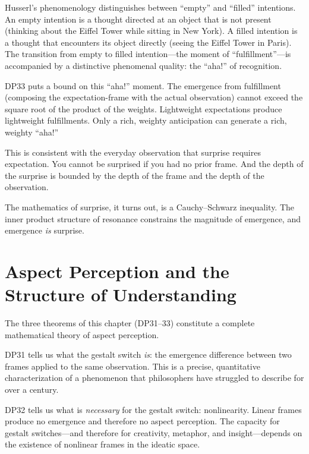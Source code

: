 \begin{interpretation}
\label{interp:phenomenology-surprise}
Husserl's phenomenology distinguishes between ``empty'' and ``filled''
intentions.  An empty intention is a thought directed at an object
that is not present (thinking about the Eiffel Tower while sitting
in New York).  A filled intention is a thought that encounters its
object directly (seeing the Eiffel Tower in Paris).  The transition
from empty to filled intention---the moment of ``fulfillment''---is
accompanied by a distinctive phenomenal quality: the ``aha!'' of
recognition.

DP33 puts a bound on this ``aha!'' moment.  The emergence from
fulfillment (composing the expectation-frame with the actual
observation) cannot exceed the square root of the product of the
weights.  Lightweight expectations produce lightweight fulfillments.
Only a rich, weighty anticipation can generate a rich, weighty
``aha!''

This is consistent with the everyday observation that surprise requires
expectation.  You cannot be surprised if you had no prior frame.
And the depth of the surprise is bounded by the depth of the frame
and the depth of the observation.

The mathematics of surprise, it turns out, is a Cauchy--Schwarz
inequality.  The inner product structure of resonance constrains
the magnitude of emergence, and emergence \emph{is} surprise.
\end{interpretation}

\section{Aspect Perception and the Structure of Understanding}

The three theorems of this chapter (DP31--33) constitute a complete
mathematical theory of aspect perception.

DP31 tells us what the gestalt switch \emph{is}: the emergence
difference between two frames applied to the same observation.
This is a precise, quantitative characterization of a phenomenon
that philosophers have struggled to describe for over a century.

DP32 tells us what is \emph{necessary} for the gestalt switch:
nonlinearity.  Linear frames produce no emergence and therefore no
aspect perception.  The capacity for gestalt switches---and therefore
for creativity, metaphor, and insight---depends on the existence of
nonlinear frames in the ideatic space.

